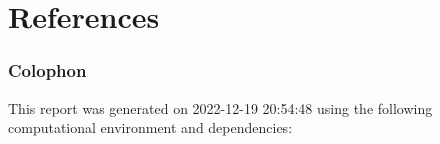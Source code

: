 \documentclass[
  number]{elsarticle}
\newlength{\cslhangindent}
\newlength{\cslentryspacingunit} %
\newenvironment{CSLReferences}[2] %
 {%
  \setlength{\parindent}{0pt}
  \ifodd #1
  \let\oldpar\par
  \def\par{\hangindent=\cslhangindent\oldpar}
  \fi
  \setlength{\parskip}{#2\cslentryspacingunit}
 }%
 {}
\begin{document}
\newpage

\hypertarget{references}{%
\section{References}\label{references}}

\hypertarget{refs}{}
\begin{CSLReferences}{0}{0}
\end{CSLReferences}

\newpage

\hypertarget{colophon}{%
\subsubsection{Colophon}\label{colophon}}

This report was generated on 2022-12-19 20:54:48 using the following
computational environment and dependencies:
\end{document}
